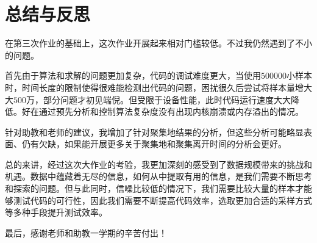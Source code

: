 \documentclass[UTF8]{ctexart}
\begin{document}
\section{总结与反思}

在第三次作业的基础上，这次作业开展起来相对门槛较低。不过我仍然遇到了不小的问题。

首先由于算法和求解的问题更加复杂，代码的调试难度更大，当使用$500000$小样本时，时间长度的限制使得很难能检测出代码的问题，困扰很久后尝试将样本量增大大$500$万，部分问题才初见端倪。但受限于设备性能，此时代码运行速度大大降低。好在通过预先分析和控制算法复杂度没有出现内核崩溃或内存溢出的情况。

针对助教和老师的建议，我增加了针对聚集地结果的分析，但这些分析可能略显表面、仍有欠缺，如果能开展更多关于聚集地和聚集离开时间的分析会更好。

总的来讲，经过这次大作业的考验，我更加深刻的感受到了数据规模带来的挑战和机遇。数据中蕴藏着无尽的信息，如何从中提取有用的信息，是我们需要不断思考和探索的问题。但与此同时，信噪比较低的情况下，我们需要比较大量的样本才能够测试代码的可行性，因此我们需要不断提高代码效率，选取更加合适的采样方式等多种手段提升测试效率。

最后，感谢老师和助教一学期的辛苦付出！
\end{document}
